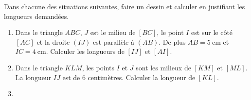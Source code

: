 
\begin{exercice}\label{exosmath-0998}

    Dans chacune des situations suivantes, faire un dessin et calculer en justifiant les longueurs demandées.
    \begin{enumerate}
        \item
            Dans le triangle \( ABC\), \( J\) est le milieu de \( [BC]\), le point \( I\) est sur le côté \( [AC]\) et la droite \( (IJ)\) est parallèle à \( (AB)\). De plus \( AB=\SI{5}{\centi\meter}\) et \( IC=\SI{4}{\centi\meter}\). Calculer les longueurs de \( [IJ]\) et \( [AI]\).
        \item
            Dans le triangle \( KLM\), les points \( I\) et \( J\) sont les milieux de \( [KM]\) et \( [ML]\). La longueur \( IJ\) est de \( 6\) centimètres. Calculer la longueur de \( [KL]\).
        \item
\begin{center}
   
\end{center}
    \end{enumerate}

\end{exercice}
